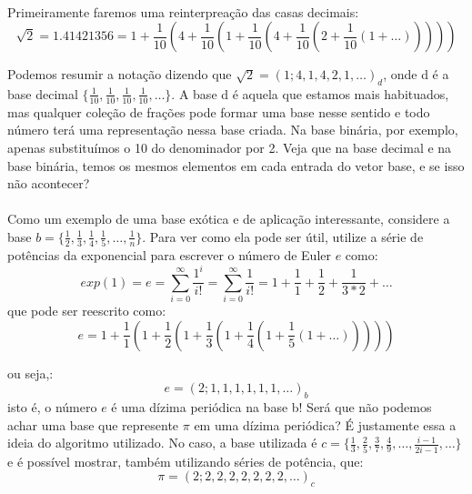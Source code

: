 \paragraph{} Primeiramente faremos uma reinterpreação das casas decimais:
\begin{equation}
    \sqrt{2} = 1.41421356 = 1 + \frac{1}{10} \left( 4 + \frac{1}{10}\left(
    1 + \frac{1}{10} \left( 4 + \frac{1}{10} \left( 2 + \frac{1}{10}
    \left(1 + \ldots \right) \right) \right) \right) \right)
\end{equation}
 
Podemos resumir a notação dizendo que $\sqrt{2} = (1;4,1,4,2,1,\ldots)_{d}$,
onde d é a base decimal $\{\frac{1}{10}, \frac{1}{10},\frac{1}{10},\frac{1}{10},
\ldots \}$. A base d é aquela que estamos mais habituados, mas qualquer coleção
de frações pode formar uma base nesse sentido e todo número terá uma
representação nessa base criada. Na base binária, por exemplo, apenas
substituímos o 10 do denominador por 2. Veja que na base decimal e na base
binária, temos os mesmos elementos em cada entrada do vetor base, e se isso não acontecer? 

\paragraph{} Como um exemplo de uma base exótica e de aplicação
interessante, considere a base $b =
\{\frac{1}{2},\frac{1}{3},\frac{1}{4},\frac{1}{5}, \ldots, \frac{1}{n}\}$. 
Para ver como ela pode ser útil, utilize a série de potências da
exponencial para escrever o número de Euler $e$ como:
\begin{equation}
    exp(1) = e = \sum_{i=0}^{\infty} \frac{1^i}{i!} = \sum_{i=0}^{\infty}
    \frac{1}{i!} = 1 + \frac{1}{1} + \frac{1}{2} + \frac{1}{3*2} + \ldots 
\end{equation}
que pode ser reescrito como:
\begin{equation}
e = 1 + \frac{1}{1}(1 + \frac{1}{2}(1 + \frac{1}{3}(1 + \frac{1}{4}(1 +
\frac{1}{5}(1 + \ldots)))))
\end{equation}

ou seja,:
\begin{equation}
    e = (2;1,1,1,1,1,1, \ldots)_b
\end{equation}
isto é, o número $e$ é uma dízima periódica na base b! Será que não podemos
achar uma base que represente $\pi$ em uma dízima periódica? É justamente essa a
ideia do algoritmo utilizado. No caso, a base utilizada é $c = \{\frac{1}{3},
\frac{2}{5}, \frac{3}{7}, \frac{4}{9},\ldots, \frac{i-1}{2i-1}, \ldots \}$ e é
possível mostrar, também utilizando séries de potência, que:
\begin{equation}
    \pi = (2;2,2,2,2,2,2,2, \ldots)_c
\end{equation}

